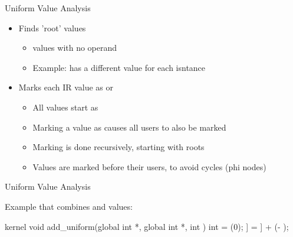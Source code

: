 \begin{frame}{Uniform Value Analysis}

\begin{itemize}
    \item Finds 'root' values
    \begin{itemize}
        \item {} values with no  operand
        \item Example:  has a different value for each isntance
    \end{itemize}
    \item Marks each IR value as  or 
    \begin{itemize}
        \item All values start as 
        \item Marking a value as  causes all users to also be marked 
        \item Marking is done recursively, starting with roots
        \item Values are marked before their users, to avoid cycles (phi nodes)
    \end{itemize}
\end{itemize}

\end{frame}


\begin{frame}[fragile]{Uniform Value Analysis}

Example that combines  and  values:

\begin{codebox}[commandchars=\\\[\]]
kernel void add_uniform(global int *\uniform[dst], global int *\uniform[src], int \uniform[alpha]) {
    int \varying[tid] = (0);
    \uniform[dst]\idx[\varying[tid]] = \uniform[src]\idx[\varying[tid]] + (\uniform[alpha] - \uniform[1]);
}
\end{codebox}


\end{frame}

